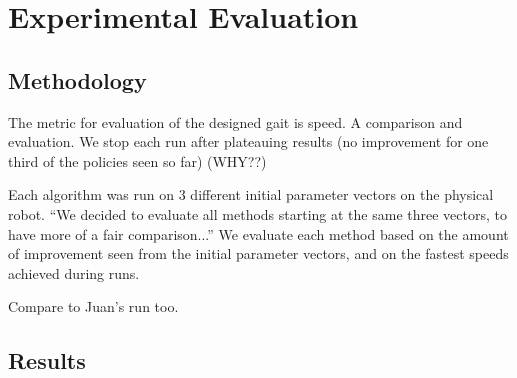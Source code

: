 \section{Experimental Evaluation}

\subsection{Methodology}


The metric for evaluation of the designed gait is speed. A comparison and evaluation. We stop each run after plateauing results (no improvement 
for one third of the policies seen so far)  (WHY??)

Each algorithm was run on 3 different initial parameter vectors on the
physical robot.  ``We decided to evaluate all methods starting at the
same three vectors, to have more of a fair comparison...'' We evaluate
each method based on the amount of improvement seen from the initial
parameter vectors, and on the fastest speeds achieved during runs.

Compare to Juan's run too.




\subsection{Results}

